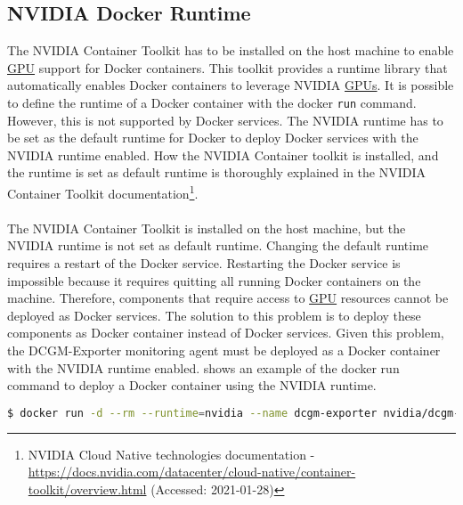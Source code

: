 \subsection{NVIDIA Docker Runtime}
The NVIDIA Container Toolkit has to be installed on the host machine to enable \hyperlink{abbr:gpu}{GPU} support for Docker containers. This toolkit provides a runtime library that automatically enables Docker containers to leverage NVIDIA \hyperlink{abbr:gpu}{GPUs}.
It is possible to define the runtime of a Docker container with the docker \texttt{run} command. However, this is not supported by Docker services. The NVIDIA runtime has to be set as the default runtime for Docker to deploy Docker services with the NVIDIA runtime enabled.
How the NVIDIA Container toolkit is installed, and the runtime is set as default runtime is thoroughly explained in the NVIDIA Container Toolkit documentation\footnote{NVIDIA Cloud Native technologies documentation - \url{https://docs.nvidia.com/datacenter/cloud-native/container-toolkit/overview.html} (Accessed: 2021-01-28)}.

\paragraph{}
The NVIDIA Container Toolkit is installed on the host machine, but the NVIDIA runtime is not set as default runtime.
Changing the default runtime requires a restart of the Docker service. Restarting the Docker service is impossible because it requires quitting all running Docker containers on the machine. Therefore, components that require access to \hyperlink{abbr:gpu}{GPU} resources cannot be deployed as Docker services.
The solution to this problem is to deploy these components as Docker container instead of Docker services.
Given this problem, the DCGM-Exporter monitoring agent must be deployed as a Docker container with the NVIDIA runtime enabled.
 shows an example of the docker run command to deploy a Docker container using the NVIDIA runtime.
\begin{lstlisting}[label=lst:06_impl-env_prob_cmd, caption=Docker run command to deploy a container using the NVIDIA runtime, language=sh, numbers=none]
$ docker run -d --rm --runtime=nvidia --name dcgm-exporter nvidia/dcgm-exporter:latest
\end{lstlisting}



